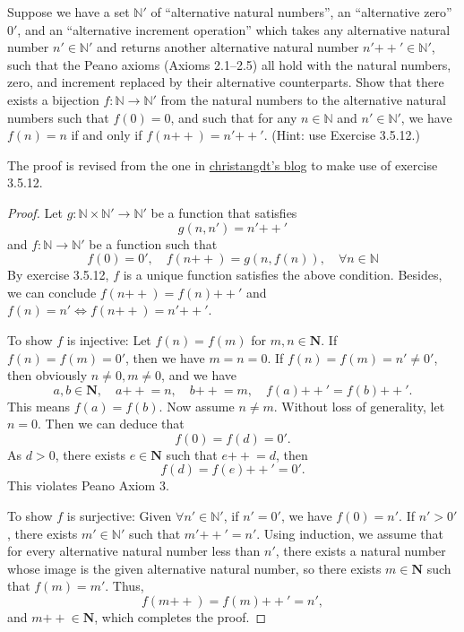 \documentclass{article}
\newcommand{\doubleplus}{\mathbin{{+}{+}}}
\begin{document}
Suppose we have a set $\mathbb{N}'$ of “alternative natural numbers”, an “alternative zero”
$0'$, and an “alternative increment operation” which takes any alternative natural
number $n' \in \mathbb{N}'$ and returns another alternative natural number $n'\doubleplus' \in \mathbb{N}'$, such
that the Peano axioms (Axioms 2.1–2.5) all hold with the natural numbers, zero,
and increment replaced by their alternative counterparts.
Show that there exists a bijection $f : \mathbb{N} \to \mathbb{N}'$ from the natural numbers
to the alternative natural numbers such that $f(0) = 0$, and such that for any
$n \in \mathbb{N}$ and $n' \in \mathbb{N}'$, we have
$f(n) = n$ if and only if $f(n\doubleplus) = n'\doubleplus'$.
(Hint: use Exercise 3.5.12.)

The proof is revised from the one in
\href{https://christangdt.home.blog/2019/04/04/%e9%99%b6%e5%93%b2%e8%bd%a9%e5%ae%9e%e5%88%86%e6%9e%903-5%e5%8f%8a%e4%b9%a0%e9%a2%98-analysis-i-3-5/}{{christangdt's blog}}
to make use of exercise 3.5.12.
\begin{proof}
    Let $g:\mathbb{N}\times\mathbb{N}'\to\mathbb{N}'$ be a function that satisfies
    \[g(n,n')=n'\doubleplus'\]
    and $f:\mathbb{N}\to\mathbb{N}'$ be a function such that
    \[f(0) = 0', \quad f(n\doubleplus) = g(n,f(n)), \quad \forall n \in \mathbb{N}\]
    By exercise 3.5.12, $f$ is a unique function satisfies the above condition.
    Besides, we can conclude $f(n\doubleplus)=f(n)\doubleplus'$ and
    $f(n) = n' \iff f(n\doubleplus) = n'\doubleplus'$.

    To show $f$ is injective: Let $f(n) = f(m)$ for $m, n \in \mathbf{N}$. If $f(n) = f(m) = 0'$, then we have $m = n = 0$.
    If $f(n) = f(m) = n' \neq 0'$, then obviously $n \neq 0, m \neq 0$, and we have
    \[
        a, b \in \mathbf{N}, \quad a\doubleplus = n, \quad b\doubleplus = m, \quad f(a)\doubleplus' = f(b)\doubleplus'.
    \]
    This means $f(a) = f(b)$. Now assume $n \neq m$. Without loss of generality, let $n = 0$. Then we can deduce that
    \[
        f(0) = f(d) = 0'.
    \]
    As $d > 0$, there exists $e \in \mathbf{N}$ such that $e\doubleplus = d$, then
    \[
        f(d) = f(e)\doubleplus' = 0'.
    \]
    This violates Peano Axiom 3.

    To show $f$ is surjective: Given $\forall n' \in \mathbb{N}'$, if $n' = 0'$, we have $f(0) = n'$. If $n' > 0'$, there exists $m' \in \mathbb{N}'$ such that $m'\doubleplus' = n'$. Using induction, we assume that for every alternative natural number less than $n'$, there exists a natural number whose image is the given alternative natural number, so there exists $m \in \mathbf{N}$ such that $f(m) = m'$. Thus,
    \[
        f(m\doubleplus) = f(m)\doubleplus' = n',
    \]
    and $m\doubleplus \in \mathbf{N}$, which completes the proof.
\end{proof}
\end{document}
